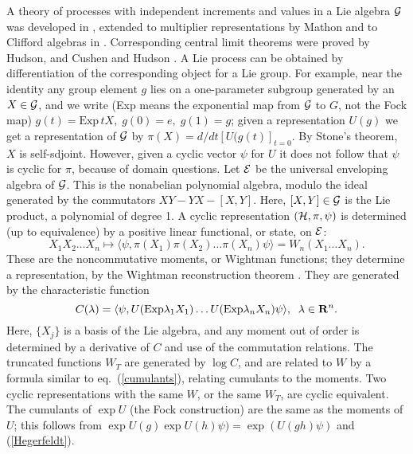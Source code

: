 A theory of processes with independent increments
and values in a Lie algebra ${\cal G}$ was developed
in \cite{RFS4}, extended to multiplier representations by Mathon
\cite{Mathon} and to Clifford algebras in \cite{Mathon2}.
Corresponding central limit theorems were proved by Hudson, and Cushen
and Hudson \cite{Cushen,Hudson7}.
A Lie process
can be obtained by differentiation of the corresponding object for a
Lie group. For example, near the identity any group element $g$ lies on a
one-parameter subgroup generated by an $X\in{\cal G}$, and we
write (Exp means the exponential map from ${\cal G}$ to $G$, not
the Fock map)
$g(t)=\mbox{Exp}\,tX,\;g(0)=e,\;g(1)=g$; given a representation $U(g)$ we get
a representation of ${\cal G}$ by $\pi(X)=d/dt[U(g(t)]_{t=0}$. By Stone's
theorem, $X$ is self-sdjoint. However, given a cyclic vector $\psi$  for $U$
it does not follow that $\psi$ is cyclic for $\pi$, because of domain
questions. Let ${\cal E}$ be the universal enveloping algebra of ${\cal G}$.
This is the nonabelian polynomial algebra, modulo the ideal generated by
the commutators $XY-YX-[X,Y]$. Here, $[X,Y]\in{\cal G}$ is the Lie product,
a polynomial of degree 1. A cyclic representation $({\cal H},\pi,\psi)$
is determined
(up to equivalence) by a positive linear functional, or state, on ${\cal E}$:
\[X_1X_2\ldots X_n\mapsto \langle\psi,\pi(X_1)\pi(X_2)\ldots\pi(X_n)\psi\rangle
=W_n(X_1\ldots X_n).\]
These are the noncommutative moments, or Wightman functions; they determine
a representation, by the Wightman reconstruction theorem \cite{SW}.
They are generated by the characteristic function
\begin{equation}
C({\lambda})=\langle\psi,U(\mbox{Exp}\lambda_1X_1)\ldots U(\mbox{Exp}
\lambda_nX_n)\psi\rangle,\;\;\lambda\in{\bf R}^n.
\label{Hegerfeldt}
\end{equation}
Here, $\{X_j\}$ is a basis of the Lie algebra, and any moment out of order
is determined by a derivative of $C$ and use of the commutation relations.
The truncated functions $W_T$ are generated by $\log C$, \cite{Hegerfeldt2}
and are related to
$W$ by a formula similar to eq.~(\ref{cumulants}), relating cumulants to the
moments. Two cyclic representations with the same $W$, or the same $W_T$,
are cyclic equivalent. The cumulants of $\exp U$ (the Fock construction)
are the same as the moments of $U$; this follows from $\exp U(g)\exp U(h)
\psi)=\exp(U(gh)\psi)$ and (\ref{Hegerfeldt}). 

